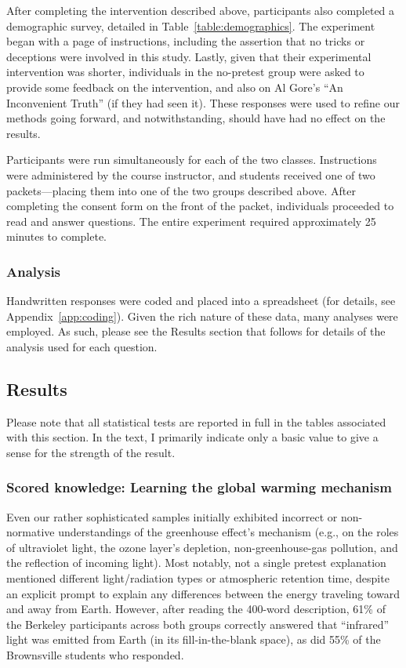 After completing the intervention described above, participants also
completed a demographic survey, detailed in Table~\ref{table:demographics}.
The experiment began with a page of instructions, including the assertion that
no tricks or deceptions were involved in this study. Lastly, given that their
experimental intervention was shorter, individuals in the no-pretest group
were asked to provide some feedback on the intervention, and also on Al Gore’s
“An Inconvenient Truth” (if they had seen it). These responses were used to
refine our methods going forward, and \textcite{bem_feeling_2011} notwithstanding,
should have had no effect on the results.

Participants were run simultaneously for each of the two classes. Instructions
were administered by the course instructor, and students received one of two
packets---placing them into one of the two groups described above. After
completing the consent form on the front of the packet, individuals proceeded to
read and answer questions. The entire experiment required approximately
25 minutes to complete.

\subsubsection{Analysis}

Handwritten responses were coded and placed into a spreadsheet (for details, see
Appendix~\ref{app:coding}). Given the rich nature of these data, many analyses
were employed. As such, please see the Results section that follows for details
of the analysis used for each question.

\subsection{Results}

Please note that all statistical tests are reported in full in the tables
associated with this section. In the text, I primarily indicate only a basic
value to give a sense for the strength of the result.

\subsubsection{Scored knowledge: Learning the global warming mechanism}

Even our rather sophisticated samples initially exhibited incorrect or
non-normative understandings of the greenhouse effect’s mechanism (e.g., on the
roles of ultraviolet light, the ozone layer’s depletion, non-greenhouse-gas
pollution, and the reflection of incoming light). Most notably, not a single
pretest explanation mentioned different light/radiation types or atmospheric
retention time, despite an explicit prompt to explain any differences between
the energy traveling toward and away from Earth. However, after reading the
400-word description, 61\% of the Berkeley participants across both groups
correctly answered that “infrared” light was emitted from Earth (in its
fill-in-the-blank space), as did 55\% of the Brownsville students who responded.

